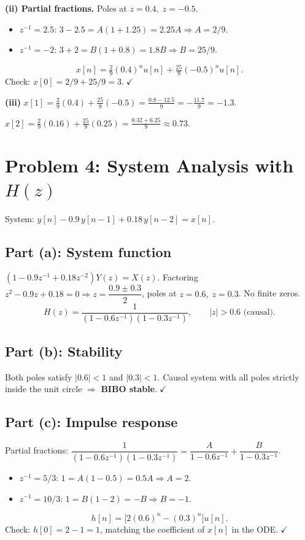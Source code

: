 \documentclass[11pt]{article}
\begin{document}
\textbf{(ii) Partial fractions.} Poles at $z=0.4,\;z=-0.5$.
\begin{itemize}[leftmargin=*]
\item $z^{-1}=2.5$: $3-2.5=A(1+1.25)=2.25A\Rightarrow A=2/9$.
\item $z^{-1}=-2$: $3+2=B(1+0.8)=1.8B\Rightarrow B=25/9$.
\end{itemize}
\[
x[n]=\tfrac{2}{9}(0.4)^{n}u[n]+\tfrac{25}{9}(-0.5)^{n}u[n].
\]
Check: $x[0]=2/9+25/9=3.\;\checkmark$

\textbf{(iii)} $x[1]=\tfrac{2}{9}(0.4)+\tfrac{25}{9}(-0.5)=\tfrac{0.8-12.5}{9}=-\tfrac{11.7}{9}=-1.3$.

$x[2]=\tfrac{2}{9}(0.16)+\tfrac{25}{9}(0.25)=\tfrac{0.32+6.25}{9}\approx 0.73$.

\section*{Problem 4: System Analysis with $H(z)$}

\noindent System: $y[n]-0.9\,y[n-1]+0.18\,y[n-2]=x[n]$.

\subsection*{Part (a): System function}
$(1-0.9z^{-1}+0.18z^{-2})Y(z)=X(z)$. Factoring $z^{2}-0.9z+0.18=0\Rightarrow z=\dfrac{0.9\pm 0.3}{2}$, poles at $z=0.6,\;z=0.3$. No finite zeros.
\begin{equation*}
\boxed{H(z)=\dfrac{1}{(1-0.6z^{-1})(1-0.3z^{-1})}, \qquad |z|>0.6 \text{ (causal)}.}
\end{equation*}

\subsection*{Part (b): Stability}
Both poles satisfy $|0.6|<1$ and $|0.3|<1$. Causal system with all poles strictly inside the unit circle $\Rightarrow$ \textbf{BIBO stable}.$\;\checkmark$

\subsection*{Part (c): Impulse response}
Partial fractions: $\dfrac{1}{(1-0.6z^{-1})(1-0.3z^{-1})}=\dfrac{A}{1-0.6z^{-1}}+\dfrac{B}{1-0.3z^{-1}}$.
\begin{itemize}[leftmargin=*]
\item $z^{-1}=5/3$: $1=A(1-0.5)=0.5A\Rightarrow A=2$.
\item $z^{-1}=10/3$: $1=B(1-2)=-B\Rightarrow B=-1$.
\end{itemize}
\begin{equation*}
\boxed{h[n]=\bigl[2(0.6)^{n}-(0.3)^{n}\bigr]u[n].}
\end{equation*}
Check: $h[0]=2-1=1$, matching the coefficient of $x[n]$ in the ODE.$\;\checkmark$
\end{document}
